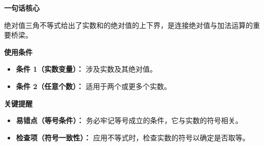 \begin{summarybox}
\textbf{\textcolor{CSummary}{一句话核心}}

绝对值三角不等式给出了实数和的绝对值的上下界，是连接绝对值与加法运算的重要桥梁。

\medskip
\textbf{\textcolor{CSummary}{使用条件}}
\begin{itemize}[leftmargin=*, itemsep=0.5em, topsep=0.4em]
    \item \textbf{条件 1（实数变量）：} 涉及实数及其绝对值。
    \item \textbf{条件 2（任意个数）：} 适用于两个或更多个实数。
\end{itemize}

\medskip
\textbf{\textcolor{CSummary}{关键提醒}}
\begin{itemize}[leftmargin=*, itemsep=0.5em, topsep=0.4em]
    \item \textbf{易错点（等号条件）：} 务必牢记等号成立的条件，它与实数的符号相关。
    \item \textbf{检查项（符号一致性）：} 应用不等式时，检查实数的符号以确定是否取等。
\end{itemize}
\end{summarybox}
